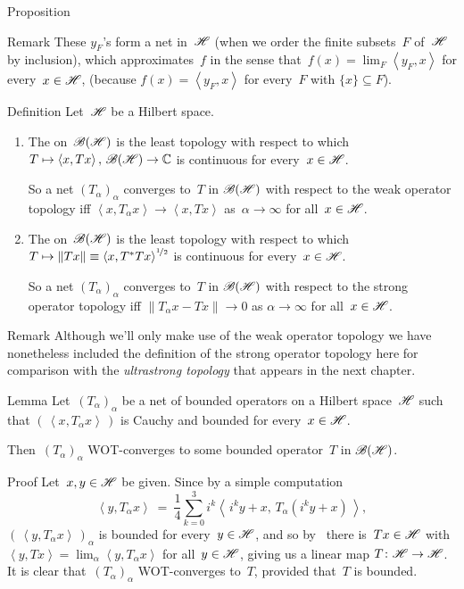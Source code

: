 \documentclass[a]{subfiles}
\begin{document}
\begin{parsec}
\begin{point}{Proposition}
\begin{point}{Remark}
These $y_F$'s form a net in~$\mathscr{H}$
(when we order the finite subsets~$F$ of~$\mathscr{H}$ by inclusion),
which approximates~$f$ in the
sense that~$f(x)=\lim_F \left<y_F,x\right>$
for every~$x\in \mathscr{H}$,
(because 
$f(x)=\left<y_F,x\right>$
for every~$F$
with $\{x\}\subseteq F$).
\end{point}
\end{point}
\begin{point}[swot]{Definition}%
Let~$\mathscr{H}$ be a Hilbert space.
\begin{enumerate}
\item
	The %
on~$\mathscr{B}(\mathscr{H})$ is the least topology
with respect to which $T\mapsto \left<x,Tx\right>,\,\mathscr{B}(\mathscr{H})\to\mathbb{C}$
is continuous for every~$x\in\mathscr{H}$.

So a net $(T_\alpha)_\alpha$
		converges to~$T$ in $\mathscr{B}(\mathscr{H})$
		with respect to the weak operator topology
		iff $\left<x,T_\alpha x\right>\to \left<x,Tx\right>$
		as~$\alpha\to\infty$ for all~$x\in \mathscr{H}$.
\item
	The %
on~$\mathscr{B}(\mathscr{H})$ is the least topology
with respect to which $T\mapsto \|Tx\|\equiv \smash{\left<x,T^*Tx\right>^{%
\nicefrac{1}{2}}}$
is continuous for every~$x\in\mathscr{H}$.

		So a net $(T_\alpha)_\alpha$
		converges to~$T$
		in $\mathscr{B}(\mathscr{H})$
		with respect to the strong operator topology iff
		$\|T_\alpha x -Tx \| \to 0$ as $\alpha\to\infty$
		for all~$x\in\mathscr{H}$.
\end{enumerate}
\begin{point}{Remark}%
Although we'll only make use of the weak operator
topology we have nonetheless included
the definition of the strong operator topology here
for comparison
with the \emph{ultrastrong
topology} that appears in the next chapter.
\end{point}
\end{point}
\begin{point}{Lemma}%
Let~$(T_\alpha)_\alpha$ be a net of bounded operators
on a Hilbert space~$\mathscr{H}$
such that $(\,\left<x,T_\alpha x \right>\,)$ is
Cauchy and bounded for every~$x\in \mathscr{H}$.

Then~$(T_\alpha)_\alpha$
WOT-converges to some bounded operator~$T$ in $\mathscr{B}(\mathscr{H})$.
\begin{point}{Proof}%
Let~$x,y\in \mathscr{H}$ be given.
Since by a simple computation
\begin{equation*}
	\textstyle
	\left<y,T_\alpha x\right>
	\ = \ \frac{1}{4}\sum_{k=0}^3
	i^k\left<\,i^ky+x,\,T_\alpha (i^ky+x)\,\right>,
\end{equation*}
 $(\,\left<y,T_\alpha x\right>\,)_\alpha$
is bounded for every~$y\in \mathscr{H}$,
and so by~ there is~$Tx\in \mathscr{H}$ 
with $\left<y,Tx\right>=\lim_\alpha \left<y,T_\alpha x\right>$
for all~$y\in\mathscr{H}$,
giving us a linear map $T\colon \mathscr{H}\to \mathscr{H}$.
It is clear that~$(T_\alpha)_\alpha$
WOT-converges to~$T$,
provided that~$T$ is bounded.


\end{point}
\end{point}
\end{parsec}
\end{document}
